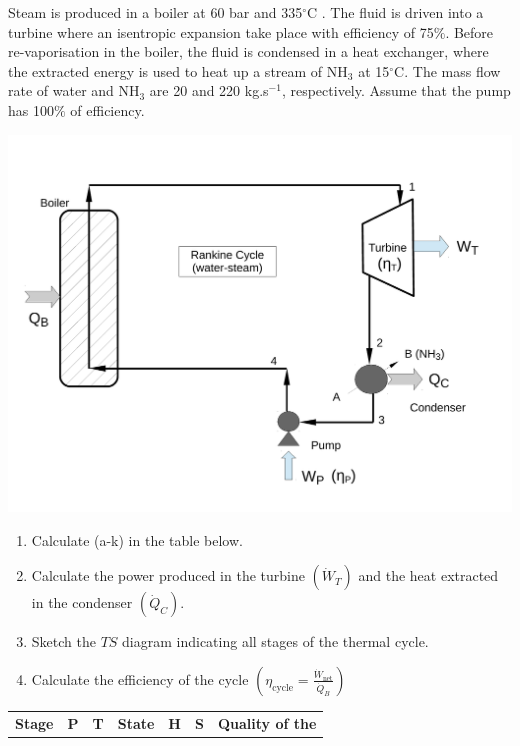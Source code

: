 \documentclass[calculator,fluidstables,datasheet,sample]{exam}
\newcommand{\frc}{\displaystyle\frac}
\begin{document}
\begin{question}

Steam is produced in a boiler at 60 bar and 335$^{\circ}$C . The fluid is driven into a turbine where an isentropic expansion take place with efficiency of 75$\%$. Before re-vaporisation in the boiler, the fluid is condensed in a heat exchanger, where the extracted energy is used to heat up a stream of NH$_{3}$ at 15$^{\circ}$C. The mass flow rate of water and NH$_{3}$ are 20 and 220 kg.s$^{-1}$, respectively. Assume that the pump has 100$\%$ of efficiency.
\begin{center}
\includegraphics[width=12.cm,height=8.cm,clip]{./Pics/RankineCycle2_Sample}
\label{exam_mod02_rankinecycle}
\end{center}
\begin{enumerate}
\item Calculate (a-k) in the table below.~
\item Calculate the power produced in the turbine $\left(\dot{W}_{T}\right)$ and the heat extracted in the condenser $\left(\dot{Q}_{C}\right)$.~
\item Sketch the $TS$ diagram indicating all stages of the thermal cycle.~
\item Calculate the efficiency of the cycle $\left(\eta_{\text{cycle}}=\frc{\dot{W}_{\text{net}}}{\dot{Q}_{B}}\right)$~
\end{enumerate}
\begin{center}
\begin{tabular} {||c | c c c c c c || }
\hline\hline
{\bf Stage} & {\bf P}    & {\bf T}        & {\bf State}    & {\bf H}             & {\bf S}                 &  {\bf Quality of the} \\

\end{tabular}
\end{center}
\end{question}
\end{document}
